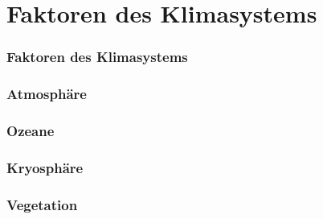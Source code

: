 \section{Faktoren des Klimasystems}

\begin{frame}
  \frametitle{Faktoren des Klimasystems}
\end{frame}

\begin{frame}
  \frametitle{Atmosphäre}
\end{frame}

\begin{frame}
  \frametitle{Ozeane}
\end{frame}

\begin{frame}
  \frametitle{Kryosphäre} %
\end{frame}

\begin{frame}
  \frametitle{Vegetation}
\end{frame}
